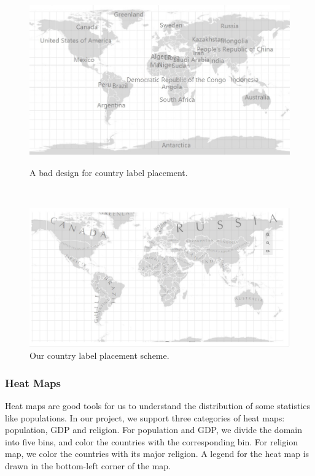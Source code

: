 \documentclass[12pt, fullpage,letterpaper]{article}
\begin{document}
\begin{figure}[h!]
    \begin{minipage}{0.49\linewidth}
        \centering
        \includegraphics[width=\textwidth]{figs/badcnname.jpg}
        \caption{A bad design for country label placement.}
        \label{fig:badcnname}
    \end{minipage}
    \hfill\
    \begin{minipage}{0.49\linewidth}
        \centering
        \includegraphics[width=\textwidth]{figs/map.jpg}
        \caption{Our country label placement scheme.}
        \label{fig:ourcnname}
    \end{minipage}
\end{figure} 


\subsubsection{Heat Maps}
Heat maps are good tools for us to understand the distribution of some statistics like populations.
In our project, we support three categories of heat maps: population, GDP and religion.
For population and GDP, we divide the domain into five bins, and color the countries with the corresponding bin.
For religion map, we color the countries with its major religion.
A legend for the heat map is drawn in the bottom-left corner of the map.
\end{document}
